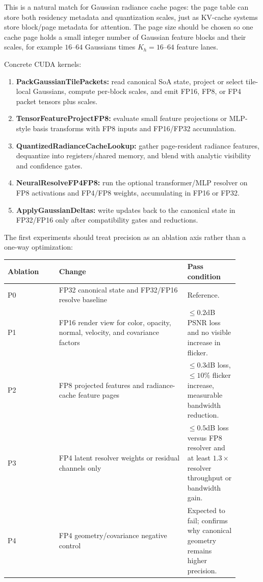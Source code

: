 \documentclass[11pt]{article}
\begin{document}
This is a natural match for Gaussian radiance cache pages: the page table can
store both residency metadata and quantization scales, just as KV-cache systems
store block/page metadata for attention. The page size should be chosen so one
cache page holds a small integer number of Gaussian feature blocks and their
scales, for example $16$--$64$ Gaussians times $K_h=16$--$64$ feature lanes.

Concrete CUDA kernels:

\begin{enumerate}
  \item \textbf{PackGaussianTilePackets:} read canonical SoA state, project or
        select tile-local Gaussians, compute per-block scales, and emit FP16,
        FP8, or FP4 packet tensors plus scales.
  \item \textbf{TensorFeatureProjectFP8:} evaluate small feature projections or
        MLP-style basis transforms with FP8 inputs and FP16/FP32 accumulation.
  \item \textbf{QuantizedRadianceCacheLookup:} gather page-resident radiance
        features, dequantize into registers/shared memory, and blend with
        analytic visibility and confidence gates.
  \item \textbf{NeuralResolveFP4FP8:} run the optional transformer/MLP resolver
        on FP8 activations and FP4/FP8 weights, accumulating in FP16 or FP32.
  \item \textbf{ApplyGaussianDeltas:} write updates back to the canonical
        state in FP32/FP16 only after compatibility gates and reductions.
\end{enumerate}

The first experiments should treat precision as an ablation axis rather than a
one-way optimization:

\begin{center}
\small
\begin{tabular}{p{0.20\linewidth}p{0.50\linewidth}p{0.20\linewidth}}
\toprule
Ablation & Change & Pass condition \\
\midrule
P0 & FP32 canonical state and FP32/FP16 resolve baseline & Reference. \\
P1 & FP16 render view for color, opacity, normal, velocity, and covariance factors & $\le 0.2$dB PSNR loss and no visible increase in flicker. \\
P2 & FP8 projected features and radiance-cache feature pages & $\le 0.3$dB loss, $\le 10\%$ flicker increase, measurable bandwidth reduction. \\
P3 & FP4 latent resolver weights or residual channels only & $\le 0.5$dB loss versus FP8 resolver and at least $1.3\times$ resolver throughput or bandwidth gain. \\
P4 & FP4 geometry/covariance negative control & Expected to fail; confirms why canonical geometry remains higher precision. \\
\bottomrule
\end{tabular}
\end{center}
\end{document}
